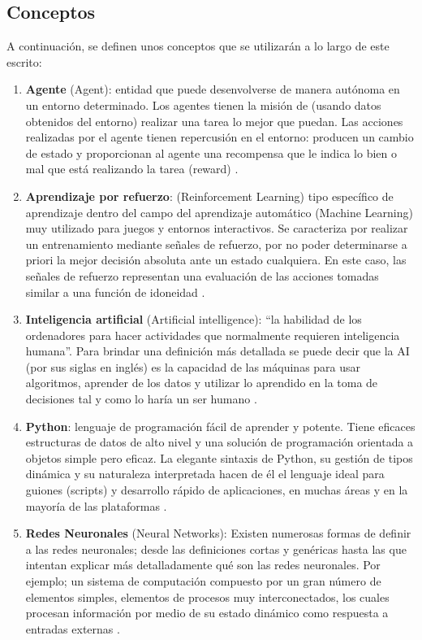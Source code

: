 \documentclass[letterpaper, 10 pt]{article}
\begin{document}
\subsection{Conceptos}
A continuación, se definen unos conceptos que se utilizarán a lo largo de este escrito:
\begin{enumerate}
	\item  \textbf{Agente} (Agent):  entidad que puede desenvolverse de manera autónoma en un entorno determinado. Los agentes tienen la misión de (usando datos obtenidos del entorno) realizar una tarea lo mejor que puedan. Las acciones realizadas por el agente tienen repercusión en el entorno: producen un cambio de estado y proporcionan al agente una recompensa que le indica lo bien o mal que está realizando la tarea (reward) \citep{fernandez2016ajustando}.
	\item  \textbf{Aprendizaje por refuerzo}: (Reinforcement Learning)  tipo específico de aprendizaje dentro del campo del aprendizaje automático (Machine Learning) muy utilizado para juegos y entornos interactivos. Se caracteriza por realizar un entrenamiento mediante señales de refuerzo, por no poder determinarse a priori la mejor decisión absoluta ante un estado cualquiera. En este caso, las señales de refuerzo representan una evaluación de las acciones tomadas similar a una función de idoneidad \citep{fernandez2016ajustando}.
	\item  \textbf{Inteligencia artificial} (Artificial intelligence): “la habilidad de los ordenadores para hacer actividades que normalmente requieren inteligencia humana”. Para brindar una definición más detallada se puede decir que la AI (por sus siglas en inglés) es la capacidad de las máquinas para usar algoritmos, aprender de los datos y utilizar lo aprendido en la toma de decisiones tal y como lo haría un ser humano \cite{rouhiainen2018inteligencia}. 
	\item  \textbf{Python}: lenguaje de programación fácil de aprender y potente. Tiene eficaces estructuras de datos de alto nivel y una solución de programación orientada a objetos simple pero eficaz. La elegante sintaxis de Python, su gestión de tipos dinámica y su naturaleza interpretada hacen de él el lenguaje ideal para guiones (scripts) y desarrollo rápido de aplicaciones, en muchas áreas y en la mayoría de las plataformas \cite{van1991guia}.
	\item  \textbf{Redes Neuronales} (Neural Networks):  Existen numerosas formas de definir a las redes neuronales; desde las definiciones cortas y genéricas hasta las que intentan explicar más detalladamente qué son las redes neuronales. Por ejemplo; un sistema de computación compuesto por un gran número de elementos simples, elementos de procesos muy interconectados, los cuales procesan información por medio de su estado dinámico como respuesta a entradas externas \cite{matich2001redes}.

\end{enumerate}
\end{document}
